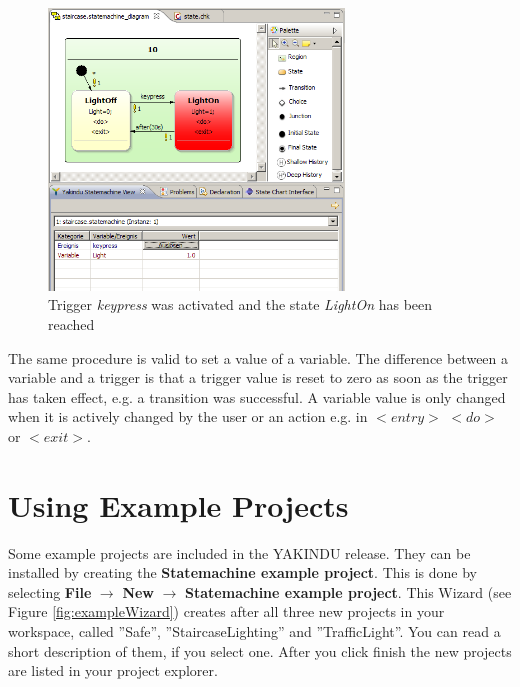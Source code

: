 \begin{figure}[ht] \center
\includegraphics[width=0.7\textwidth]{./Pictures/runningSim_3}
\caption{\label{fig:runningSim_3}Trigger \textit{keypress} was activated and
the state \textit{LightOn} has been reached}
\end{figure}

The same procedure is valid to set a value of a variable. The difference between
a variable and a trigger is that a trigger value is reset to zero as soon as the
trigger has taken effect, e.g. a transition was successful. A variable value is
only changed when it is actively changed by the user or an action e.g. in
$<entry>$ $<do>$ or $<exit>$.


\pagebreak
\section{Using Example Projects}
\label{sec:exampleProjects} 

Some example projects are included in the YAKINDU release. They can be installed
by creating the \textbf{Statemachine example project}. This is done by selecting
\textbf{File} $\rightarrow$ \textbf{New} $\rightarrow$ \textbf{Statemachine
example project}. This Wizard (see Figure \ref{fig:exampleWizard}) creates after
all three new projects in your workspace, called ''Safe'', ''StaircaseLighting''
and ''TrafficLight''. You can read a short description of them, if you select
one. After you click finish the new projects are listed in your project explorer.

